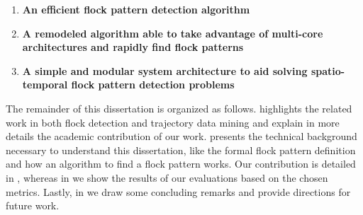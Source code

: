 \begin{enumerate}
    \item \textbf{An efficient flock pattern detection algorithm}
    \item \textbf{A remodeled algorithm able to take advantage of multi-core architectures and rapidly find flock
        patterns}
    \item \textbf{A simple and modular system architecture to aid solving spatio-temporal flock pattern detection problems}
\end{enumerate}

The remainder of this dissertation is organized as follows.  highlights the related work in
both flock detection and trajectory data mining and explain in more details the academic contribution of our work.
 presents the technical background necessary to understand this dissertation, like the
formal flock pattern definition and how an algorithm to find a flock pattern works. Our contribution is detailed in
, whereas in  we show the results of our evaluations based on the chosen
metrics. Lastly, in  we draw some concluding remarks and provide directions for future work.
